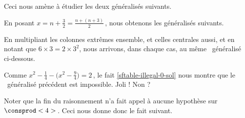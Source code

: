 \vspace{-1.5ex}
Ceci nous amène à étudier les deux \sftab[x] généralisés suivants.

\begin{center}
\end{center}


En posant $x = n + \frac32 = \frac{n + (n + 3)}{2}$\,, nous obtenons les \sftab[x] généralisés suivants.

\begin{center}
\end{center}


En multipliant les colonnes extrêmes ensemble, et celles centrales aussi, et en notant que $6 \times 3 = 2 \times 3^2$, nous arrivons, dans chaque cas, au même \sftab\ généralisé ci-dessous.

\begin{center}
\end{center}


Comme $x^2 - \frac14 - \big( x^2 - \frac94 \big) = 2$\,, le fait \ref{sftable-illegal-0-sol} nous montre que le \sftab\ généralisé précédent est impossible. Joli ! Non ?

\smallskip

Noter que la fin du raisonnement n'a fait appel à aucune hypothèse sur $\consprod<4>$\,. Ceci nous donne donc le fait suivant.


